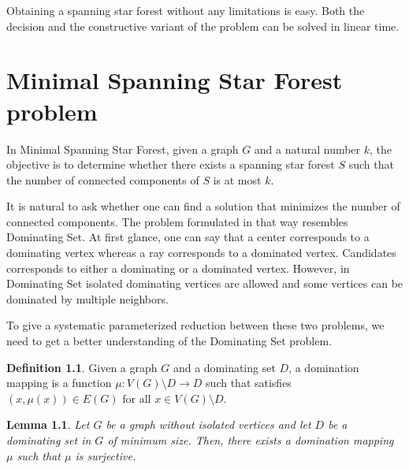 \documentclass[en]{pracamgr}
\newtheorem{lemma}{Lemma}
\theoremstyle{definition}
\newtheorem{definition}{Definition}
\newcommand{\ssf}{spanning star forest}
\newcommand{\mssfp}{{\sc Minimal Spanning Star Forest}}
\newcommand{\domsetp}{{\sc Dominating Set}}
\begin{document}
Obtaining a \ssf{} without any limitations is easy. Both the decision and the constructive variant of the problem can be solved in linear time.

\chapter{Minimal Spanning Star Forest problem}\label{sec4}

In \mssfp{}, given a graph $G$ and a natural number $k$, the objective is to determine whether there exists a \ssf{} $S$ such that the number of connected components of $S$ is at most $k$.

It is natural to ask whether one can find a solution that minimizes the number of connected components. The problem formulated in that way resembles \domsetp{}. At first glance, one can say that a center corresponds to a dominating vertex whereas a ray corresponds to a dominated vertex. Candidates corresponds to either a dominating or a dominated vertex. However, in \domsetp{} isolated dominating vertices are allowed and some vertices can be dominated by multiple neighbors. 

To give a systematic parameterized reduction between these two problems, we need to get a better understanding of the \domsetp{} problem.

\begin{definition}
	Given a graph $G$ and a dominating set $D$, a {\normalfont domination mapping} is a function $\mu:V(G) \setminus D \rightarrow D$ such that satisfies $(x,\mu(x)) \in E(G)$ for all $x \in V(G) \setminus D$.
\end{definition}

\begin{lemma}\label{dom mapping}
	Let $G$ be a graph without isolated vertices and let $D$ be a dominating set in $G$ of minimum size. Then, there exists a domination mapping $\mu$ such that $\mu$ is surjective.
\end{lemma}
\end{document}
